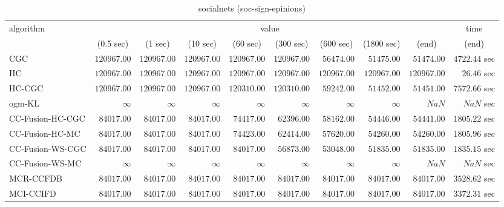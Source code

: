 \begin{table}[H]
\scriptsize
\centering
\caption{socialnets (soc-sign-epinions)}
\label{tab:anytimetable-socialnets-soc-sign-epinions}
\begin{tabular}{lrrrrrrrrr}
\toprule
           algorithm &                                   \multicolumn{8}{c}{value} & \multicolumn{1}{c}{time}   \\  
\cmidrule(lr){2-9}\cmidrule(lr){10-10}   
                     & \multicolumn{1}{c}{(0.5 sec)} & \multicolumn{1}{c}{(1 sec)} & \multicolumn{1}{c}{(10 sec)} & \multicolumn{1}{c}{(60 sec)} & \multicolumn{1}{c}{(300 sec)} & \multicolumn{1}{c}{(600 sec)} & \multicolumn{1}{c}{(1800 sec)} & \multicolumn{1}{c}{(end)} & \multicolumn{1}{c}{(end)}   \\ \midrule 
                 CGC & $    120967.00$ & $    120967.00$ & $    120967.00$ & $    120967.00$ & $    120967.00$ & $     56474.00$ & $     51475.00$ & $     51474.00$ & $      4722.44$ sec   \\ 
                  HC & $    120967.00$ & $    120967.00$ & $    120967.00$ & $    120967.00$ & $    120967.00$ & $    120967.00$ & $    120967.00$ & $    120967.00$ & $        26.46$ sec   \\ 
              HC-CGC & $    120967.00$ & $    120967.00$ & $    120967.00$ & $    120310.00$ & $    120310.00$ & $     59242.00$ & $     51452.00$ & $     51451.00$ & $      7572.66$ sec   \\ 
              ogm-KL & $\infty$ & $\infty$ & $\infty$ & $\infty$ & $\infty$ & $\infty$ & $\infty$ & $          NaN$ & $          NaN$ sec   \\ 
    CC-Fusion-HC-CGC & $     84017.00$ & $     84017.00$ & $     84017.00$ & $     74417.00$ & $     62396.00$ & $     58162.00$ & $     54446.00$ & $     54441.00$ & $      1805.22$ sec   \\ 
     CC-Fusion-HC-MC & $     84017.00$ & $     84017.00$ & $     84017.00$ & $     74423.00$ & $     62414.00$ & $     57620.00$ & $     54260.00$ & $     54260.00$ & $      1805.96$ sec   \\ 
    CC-Fusion-WS-CGC & $     84017.00$ & $     84017.00$ & $     84017.00$ & $     84017.00$ & $     56873.00$ & $     53048.00$ & $     51835.00$ & $     51835.00$ & $      1835.15$ sec   \\ 
     CC-Fusion-WS-MC & $\infty$ & $\infty$ & $\infty$ & $\infty$ & $\infty$ & $\infty$ & $\infty$ & $          NaN$ & $          NaN$ sec   \\ 
\cmidrule{1-1} 
           MCR-CCFDB & $     84017.00$ & $     84017.00$ & $     84017.00$ & $     84017.00$ & $     84017.00$ & $     84017.00$ & $     84017.00$ & $     84017.00$ & $      3528.62$ sec   \\ 
\cmidrule{1-1} 
           MCI-CCIFD & $     84017.00$ & $     84017.00$ & $     84017.00$ & $     84017.00$ & $     84017.00$ & $     84017.00$ & $     84017.00$ & $     84017.00$ & $      3372.31$ sec   \\ 
\bottomrule
\end{tabular}
\end{table}

